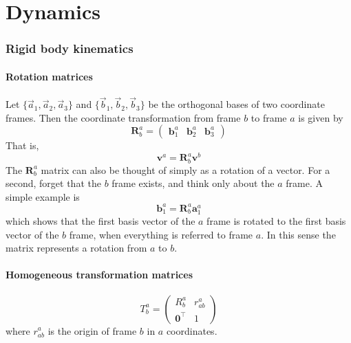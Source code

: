 \part{Dynamics}
\section{Rigid body kinematics}
\subsection{Rotation matrices}
Let $\{\vec{a}_1, \vec{a}_2, \vec{a}_3\}$ and $\{\vec{b}_1, \vec{b}_2, \vec{b}_3\}$ be the orthogonal bases of two coordinate frames. Then the coordinate transformation from frame $b$ to frame $a$ is given by
\begin{equation}
    \mathbf{R}^a_b = 
    \begin{pmatrix}
    \mathbf{b}^a_1 & \mathbf{b}^a_2 & \mathbf{b}^a_3 
    \end{pmatrix}
\end{equation}
That is,
\begin{equation}
    \mathbf{v}^a = \mathbf{R}^a_b \mathbf{v}^b
\end{equation}
The $\mathbf{R}^a_b$ matrix can also be thought of simply as a rotation of a vector. For a second, forget that the $b$ frame exists, and think only about the $a$ frame. A simple example is 
\begin{equation}
    \mathbf{b}^a_1 = \mathbf{R}^a_b \mathbf{a}^a_1
\end{equation}
which shows that the first basis vector of the $a$ frame is rotated to the first basis vector of the $b$ frame, when everything is referred to frame $a$. In this sense the matrix represents a rotation from $a$ to $b$.

\subsection{Homogeneous transformation matrices}
\begin{equation}
    T^a_b = 
    \begin{pmatrix}
        R^a_b & r^a_{ab}\\
        \mathbf{0}^\top & 1
    \end{pmatrix}
\end{equation}
where $r^a_{ab}$ is the origin of frame $b$ in $a$ coordinates.

